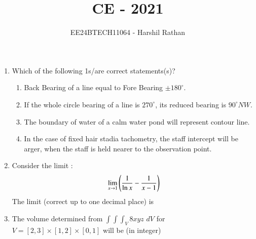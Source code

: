 \documentclass[journal]{IEEEtran}
\begin{document}

\vspace{3cm}

\title{CE - 2021}
\author{EE24BTECH11064 - Harshil Rathan}
\maketitle

\renewcommand{\thefigure}{\theenumi}
\renewcommand{\thetable}{\theenumi}

\begin{enumerate}
\item Which of the following 1s/are correct statements(s)?
\begin{enumerate}
    \item Back Bearing of a line equal to Fore Bearing $\pm 180^\circ$.
    \item If the whole circle bearing of a line is $270^\circ$, its reduced bearing is $90^\circ NW$.
    \item The boundary of water of a calm water pond will represent contour line.
    \item In the case of fixed hair stadia tachometry, the staff intercept will be arger, when the staff is held nearer to the observation point.
\end{enumerate}
\item Consider the limit :
\begin{align*}
    \lim_{x\rightarrow 1}\left(\frac{1}{\ln{x}}-\frac{1}{x-1}\right)
\end{align*}
The limit (correct up to one decimal place) is \underline{\hspace{1cm}} 
\vspace{0.5cm}

\item The volume determined from $\int\int\int_{V} 8xyz$ $dV$ for $V=[2,3]\times[1,2]\times[0,1]$ will be (in integer) \underline{\hspace{1cm}} 


\end{enumerate}
\end{document}
